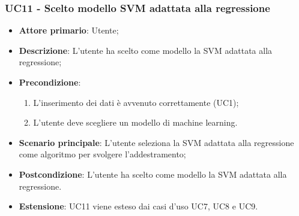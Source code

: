 \subsubsection{UC11 - Scelto modello SVM adattata alla regressione}
\label{sssec:uc11}
\begin{itemize}
  \item \textbf{Attore primario}: Utente;
  \item \textbf{Descrizione}: L'utente ha scelto come modello la SVM adattata alla regressione;
  \item \textbf{Precondizione}:
  \begin{enumerate}
    \item L'inserimento dei dati è avvenuto correttamente (UC1);
    \item L'utente deve scegliere un modello di machine learning.
  \end{enumerate}
  \item \textbf{Scenario principale}: L'utente seleziona la SVM adattata alla regressione come algoritmo per svolgere l'addestramento;
  \item \textbf{Postcondizione}: L'utente ha scelto come modello la SVM adattata alla regressione.
  \item \textbf{Estensione}: UC11 viene esteso dai casi d'uso UC7, UC8 e UC9.
\end{itemize}
